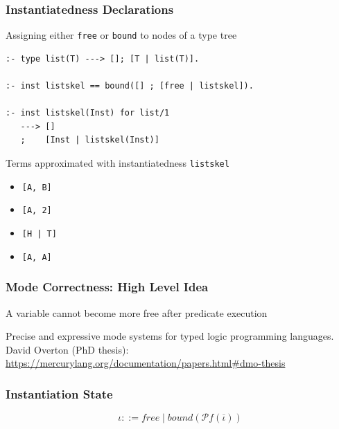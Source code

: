 \documentclass{beamer}
\newcommand{\cmark}{\ding{51}}%
\newcommand{\xmark}{\ding{55}}%
\begin{document}
\begin{frame}[fragile]
  \frametitle{Instantiatedness Declarations}
\begin{center}
  Assigning either \texttt{free} or \texttt{bound} to nodes of a type tree
\end{center}

\begin{lstlisting}[]
:- type list(T) ---> []; [T | list(T)].

:- inst listskel == bound([] ; [free | listskel]).

:- inst listskel(Inst) for list/1
   ---> []
   ;    [Inst | listskel(Inst)]
\end{lstlisting}

\begin{center}
Terms approximated with instantiatedness \texttt{listskel}

\end{center}

\begin{itemize}
  \item[\cmark] \texttt{[A, B]}
  \item[\xmark] \texttt{[A, 2]}
  \item[\xmark] \texttt{[H | T]}
  \item[\xmark] \texttt{[A, A]}
\end{itemize}
\end{frame}


\begin{frame}[fragile]
  \frametitle{Mode Correctness: High Level Idea}
\begin{center}
  A variable cannot become more free after predicate execution
\end{center}

\vfill

Precise and expressive mode systems for typed logic programming languages.
David Overton (PhD thesis): \url{https://mercurylang.org/documentation/papers.html#dmo-thesis}
\end{frame}

\begin{frame}[fragile]
  \frametitle{Instantiation State}
$$
  \iota ::= free \mid bound(\mathcal{P} f (\overline{\iota}))
$$

\end{frame}
\end{document}
